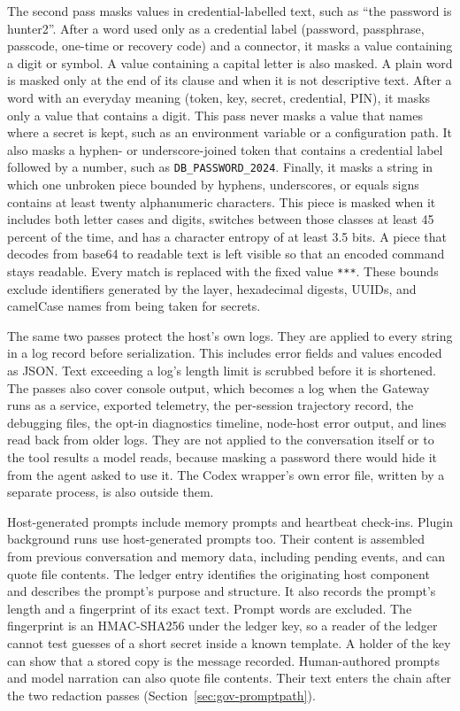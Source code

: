 {\color{red}The second pass masks values in credential-labelled text, such
as ``the password is hunter2''. After a word used only as a credential label
(password, passphrase, passcode, one-time or recovery code) and a connector,
it masks a value containing a digit or symbol. A value containing a capital
letter is also masked. A plain word is masked only at the end of its clause
and when it is not descriptive text.
After a word with an everyday meaning (token, key, secret, credential, PIN),
it masks only a value that contains a digit. This pass never masks a value
that names where a secret is kept, such as an environment variable or a
configuration path. It also masks a hyphen- or underscore-joined token that
contains a credential label followed by a number, such as
\texttt{DB\_PASSWORD\_2024}. Finally, it masks a string in which one unbroken
piece bounded by hyphens, underscores, or equals signs contains at least
twenty alphanumeric characters. This piece is masked when it includes both
letter cases and digits, switches between those classes at least 45 percent
of the time, and has a character entropy of at least 3.5 bits. A piece that
decodes from base64 to readable text is left visible so that an encoded command
stays readable. Every match is replaced with the fixed value \texttt{***}.
These bounds exclude identifiers generated by the layer, hexadecimal
digests, UUIDs, and camelCase names from being taken for secrets.

The same two passes protect the host's own logs. They are applied to every
string in a log record before serialization. This includes error fields and
values encoded as JSON. Text exceeding a log's length limit is scrubbed before
it is shortened. The passes also
cover console output, which becomes a log when the Gateway runs as a service,
exported telemetry, the per-session trajectory record, the debugging files,
the opt-in diagnostics timeline, node-host error output, and lines read back
from older logs. They are not applied to the conversation
itself or to the tool results a model reads, because masking a password there
would hide it from the agent asked to use it. The Codex wrapper's own error
file, written by a separate process, is also outside them.

Host-generated prompts include memory prompts and heartbeat check-ins.
Plugin background runs use host-generated prompts too. Their content is assembled from previous
conversation and memory data, including pending events, and can quote file
contents. The ledger entry identifies the originating host component and
describes the prompt's purpose and structure. It also records the prompt's
length and a fingerprint of its exact text. Prompt words are excluded.
The fingerprint is an HMAC-SHA256 under the
ledger key, so a reader of the ledger cannot test guesses of a short secret
inside a known template. A holder of the key can show that a stored copy is
the message recorded. Human-authored prompts and model narration can also quote
file contents. Their text enters the chain after the two redaction passes
(Section~\ref{sec:gov-promptpath}).}

